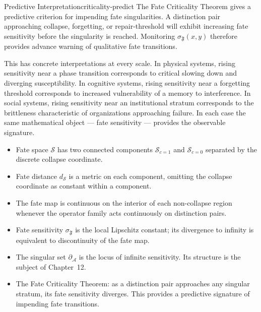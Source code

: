 \documentclass[12pt,twoside,openright]{book}
\newcommand{\fateMap}{\mathfrak{F}}
\newcommand{\fateSpace}{\mathcal{S}}
\newcommand{\collapseInd}{c}             %
\newcommand{\fateSens}[1]{\sigma_{\fateMap}(#1)}
\newcommand{\singSet}{\partial_{\!\mathcal{A}}}
\newcommand{\fateComp}[1]{\fateSpace_{\collapseInd=#1}}
\newenvironment{chapsummary}{%
  \begin{tcolorbox}[colback=DistBlue!5,colframe=DistBlue,
    title={\faBookOpen\enspace Summary},
    fonttitle=\sffamily\bfseries\color{white},
    attach boxed title to top left={yshift=-2mm,xshift=4mm},
    boxed title style={colback=DistBlue,rounded corners}]
  \begin{itemize}[nosep,leftmargin=*]}{%
  \end{itemize}\end{tcolorbox}}
\providecommand{\fateComp}[1]{\fateSpace_{\collapseInd=#1}}
\providecommand{\fateSens}[1]{\sigma_{\fateMap}(#1)}
\providecommand{\singSet}{\partial_{\!\mathcal{A}}}
\begin{document}
\begin{remark}{Predictive Interpretation}{criticality-predict}
The Fate Criticality Theorem gives a predictive criterion for
impending fate singularities. A distinction pair approaching
collapse, forgetting, or repair-threshold will exhibit
increasing fate sensitivity before the singularity is reached.
Monitoring $\fateSens{x,y}$ therefore provides advance warning
of qualitative fate transitions.

This has concrete interpretations at every scale. In physical
systems, rising sensitivity near a phase transition corresponds
to critical slowing down and diverging susceptibility. In
cognitive systems, rising sensitivity near a forgetting
threshold corresponds to increased vulnerability of a memory
to interference. In social systems, rising sensitivity near
an institutional stratum corresponds to the brittleness
characteristic of organizations approaching failure. In each
case the same mathematical object --- fate sensitivity ---
provides the observable signature.
\end{remark}

\begin{chapsummary}
\item Fate space $\fateSpace$ has two connected components
  $\fateComp{1}$ and $\fateComp{0}$ separated by the discrete
  collapse coordinate.
\item Fate distance $d_{\fateSpace}$ is a metric on each component,
  omitting the collapse coordinate as constant within a component.
\item The fate map is continuous on the interior of each
  non-collapse region whenever the operator family acts
  continuously on distinction pairs.
\item Fate sensitivity $\sigma_{\fateMap}$ is the local Lipschitz
  constant; its divergence to infinity is equivalent to
  discontinuity of the fate map.
\item The singular set $\singSet$ is the locus of infinite
  sensitivity. Its structure is the subject of Chapter~12.
\item The Fate Criticality Theorem: as a distinction pair
  approaches any singular stratum, its fate sensitivity
  diverges. This provides a predictive signature of impending
  fate transitions.
\end{chapsummary}

\end{document}
